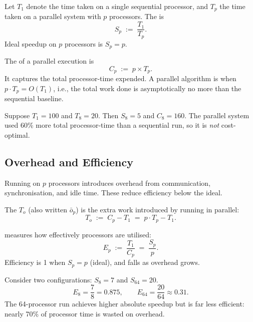 \begin{ppdefn}
Let $T_1$ denote the time taken on a single sequential processor, and $T_p$ the
time taken on a parallel system with $p$ processors. The  is
\[
  S_p \;:=\; \frac{T_1}{T_p}.
\]
Ideal speedup on $p$ processors is $S_p = p$.
\end{ppdefn}

\begin{ppdefn}
The  of a parallel execution is
\[
  C_p \;:=\; p \times T_p.
\]
It captures the total processor-time expended. A parallel algorithm is
 when $p \cdot T_p = O(T_1)$, i.e., the total work
done is asymptotically no more than the sequential baseline.
\end{ppdefn}

\begin{ppexample}
Suppose $T_1 = 100$ and $T_8 = 20$. Then $S_8 = 5$ and $C_8 = 160$. The
parallel system used 60\% more total processor-time than a sequential run,
so it is \emph{not} cost-optimal.
\end{ppexample}

\subsection{Overhead and Efficiency}

Running on $p$ processors introduces overhead from communication,
synchronisation, and idle time. These reduce efficiency below the ideal.

\begin{ppdefn}
The  $T_o$ (also written $\bar{o}_p$) is the
extra work introduced by running in parallel:
\[
  T_o \;:=\; C_p - T_1 \;=\; p \cdot T_p - T_1.
\]
\end{ppdefn}

\begin{ppdefn}
 measures how effectively processors are utilised:
\[
  E_p \;:=\; \frac{T_1}{C_p} \;=\; \frac{S_p}{p}.
\]
Efficiency is 1 when $S_p = p$ (ideal), and falls as overhead grows.
\end{ppdefn}

\begin{ppexample}
Consider two configurations: $S_8 = 7$ and $S_{64} = 20$.
\[
  E_8 = \frac{7}{8} = 0.875, \qquad E_{64} = \frac{20}{64} \approx 0.31.
\]
The 64-processor run achieves higher absolute speedup but is far less efficient:
nearly 70\% of processor time is wasted on overhead.
\end{ppexample}

